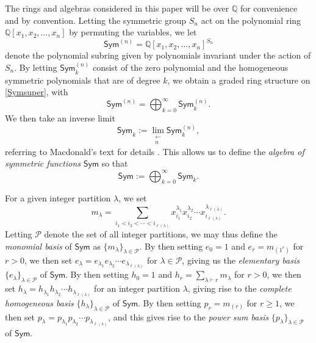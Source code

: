\documentclass{amsart}
\theoremstyle{definition}
\begin{document}
 The rings and algebras considered in this paper will be over $\mathbb{Q}$ for convenience and by convention. Letting the symmetric 
 group $S_n$ act on the polynomial ring $\mathbb{Q}[x_1, x_2, \ldots, x_n]$ by permuting the variables, we let
\begin{equation}\label{Symsuper}
 \textsf{Sym}^{(n)} 
 = \mathbb{Q}[x_1, x_2, 
 \ldots, x_n]^{S_{n}} 
\end{equation} 
 denote the polynomial subring given by polynomials invariant under the action of $S_n$. By letting $\textsf{Sym}^{(n)}_{k}$ consist 
 of the zero polynomial and the homogeneous symmetric polynomials that are of degree $k$, we obtain a graded ring
 structure on \eqref{Symsuper}, with $$ \textsf{Sym}^{(n)} 
 = \bigoplus_{k=0}^{\infty} \textsf{Sym}^{(n)}_{k}.$$ We then take an inverse limit
\begin{equation*} 
 \textsf{Sym}_{k} := \lim_{\substack{\longleftarrow\\ n }} \textsf{Sym}_{k}^{(n)}, 
\end{equation*}
 referring to Macdonald's text for details \cite[p.\ 18]{Macdonald1995}. This allows us to define the \emph{algebra of symmetric 
 functions} $\textsf{Sym}$ so that 
\begin{equation}\label{gradedSym}
 \textsf{Sym} := \bigoplus_{k=0}^{\infty} \textsf{Sym}_{k}.
\end{equation}

 For a given integer partition $\lambda$, we set
\begin{equation*}
 m_{\lambda} = \sum_{ i_{1} < i_{2} < \cdots < i_{\ell(\lambda)} } 
 x_{i_{1}}^{\lambda_{1}} x_{i_{2}}^{\lambda_{2}} \cdots 
 x_{i_{\ell(\lambda)}}^{\lambda_{\ell(\lambda)}}.
\end{equation*}
 Letting $\mathcal{P}$ denote the set of all integer partitions, we may thus define the \emph{monomial basis} of $\textsf{Sym}$ as 
 $\{ m_{\lambda} \}_{\lambda \in \mathcal{P}}$. By then setting $e_0 = 1$ and $ e_{r} = m_{(1^r)} $ for $r > 0$, we then set 
 $e_{\lambda} = e_{\lambda_1} e_{\lambda_2} \cdots e_{\lambda_{\ell(\lambda)}}$ for $\lambda \in \mathcal{P}$, giving us the 
 \emph{elementary basis} $\{ e_{\lambda} \}_{\lambda \in \mathcal{P}}$ of $\textsf{Sym}$. By then setting $h_0 = 1$ and $ h_r = 
 \sum_{\lambda \vdash r} m_{\lambda} $ for $r > 0$, we then set $h_{\lambda} = h_{\lambda_{1}} h_{\lambda_{2}} \cdots 
 h_{\lambda_{\ell(\lambda)}}$ for an integer partition $\lambda$, giving rise to the \emph{complete homogeneous basis} $\{ 
 h_{\lambda} \}_{\lambda \in \mathcal{P}}$ of $\textsf{Sym}$. By then setting $p_r = m_{(r)}$ for $r \geq 1$, we then set $p_{\lambda} = 
 p_{\lambda_{1}} p_{\lambda_{2}} \cdots p_{\lambda_{\ell(\lambda)}}$, and this gives rise to the \emph{power sum basis} $\{ p_{\lambda} 
 \}_{\lambda \in \mathcal{P}}$ of $\textsf{Sym}$. 
\end{document}
